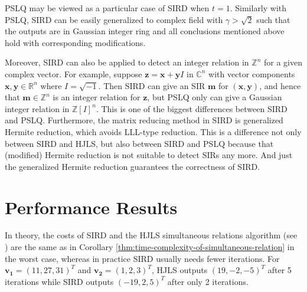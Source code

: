 \documentclass{sig-alternate}
\numberwithin{theorem}{section} \numberwithin{equation}{section}
\begin{document}
\begin{rem}
PSLQ may be viewed as a particular case of SIRD when $t = 1$.
Similarly with PSLQ, SIRD can be easily generalized to complex field
with $\gamma>\sqrt{2}$ such that the  outputs are in Gaussian
integer ring and all conclusions mentioned above hold with
corresponding modifications.
\end{rem}
\begin{rem}
Moreover, SIRD can also be applied to detect an integer relation in
$\mathbb{Z}^n$ for a given complex vector. For example, suppose
$\mathbf{z} = \mathbf{x} + \mathbf{y}I$ in $\mathbb{C}^n$ with
vector components $\mathbf{x}, \mathbf{y} \in \mathbb{R}^n$ where $I
= \sqrt{-1}$. Then SIRD can give an SIR $\mathbf{m}$ for
$(\mathbf{x},\mathbf{y})$, and hence that
$\mathbf{m}\in\mathbb{Z}^n$ is an integer relation for $\mathbf{z}$,
but PSLQ only can give a Gaussian integer relation in
$\mathbb{Z}[I]^n$. This is one of
the biggest differences between SIRD and PSLQ. Furthermore, the matrix reducing method in SIRD is generalized Hermite reduction,
which avoids LLL-type reduction. This is  a difference not only
between SIRD and HJLS, but also between SIRD and PSLQ because that
(modified) Hermite reduction is not suitable to detect SIRs any more. And just the generalized Hermite reduction guarantees
the correctness of SIRD.
\end{rem}





\section{Performance Results}\label{sec:Performance results}
In theory, the costs of SIRD and the HJLS simultaneous relations
algorithm (see \cite[section 5]{HJL1989}) are the same as in
Corollary \ref{thm:time-complexity-of-simultaneous-relation} in the
worst case, whereas in practice  SIRD usually needs fewer
iterations. For $\mathbf{v_1} = (11,27,31)^T$ and $\mathbf{v_2} =
(1,2,3)^T$, HJLS outputs $(19, -2, -5)^T$ after 5 iterations while
SIRD outputs $(-19, 2, 5)^T$ after only 2 iterations.
\end{document}
